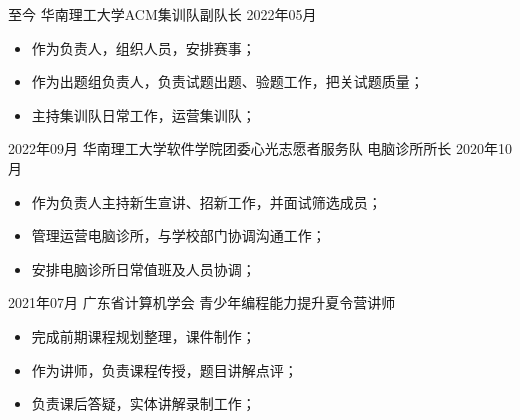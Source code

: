 %
%



\begin{experiences}    
    \activity
    {至今}       {华南理工大学ACM集训队}{副队长}{}
    {2022年05月} {
      			  	\begin{itemize}
      			  		\item 作为负责人，组织人员，安排赛事；
      			  		\item 作为出题组负责人，负责试题出题、验题工作，把关试题质量；
      			  		\item 主持集训队日常工作，运营集训队；
      			  	\end{itemize}
                }
    \emptySeparator
    \activity
    {2022年09月} {华南理工大学软件学院团委心光志愿者服务队 电脑诊所}{所长}{}
    {2020年10月} {
      			  	\begin{itemize}
      			  		\item 作为负责人主持新生宣讲、招新工作，并面试筛选成员；
      			  		\item 管理运营电脑诊所，与学校部门协调沟通工作；
      			  		\item 安排电脑诊所日常值班及人员协调；
      			  	\end{itemize}
                }    
    \emptySeparator
    \activity
    {2021年07月}     {广东省计算机学会 青少年编程能力提升夏令营}{讲师}{}
    {} {
      			  	\begin{itemize}
      			  		\item 完成前期课程规划整理，课件制作；
      			  		\item 作为讲师，负责课程传授，题目讲解点评；
      			  		\item 负责课后答疑，实体讲解录制工作；
      			  	\end{itemize}
                }    
      
\end{experiences}
